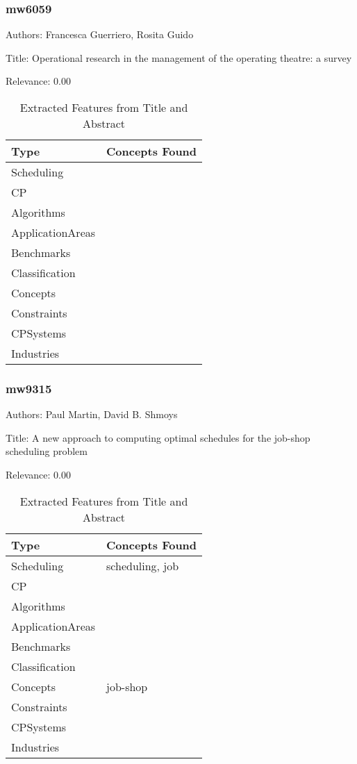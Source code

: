 \subsubsection{mw6059}
\label{mw:mw6059}

Authors: Francesca Guerriero, Rosita Guido

Title: Operational research in the management of the operating theatre: a survey

Relevance:  0.00

{\scriptsize
\begin{longtable}{p{2cm}p{20cm}}
\caption{Extracted Features from Title and Abstract}\\ \toprule
Type & Concepts Found\\ \midrule
\endhead
\bottomrule
\endfoot
Scheduling & \\ 
CP & \\ 
Algorithms & \\ 
ApplicationAreas & \\ 
Benchmarks & \\ 
Classification & \\ 
Concepts & \\ 
Constraints & \\ 
CPSystems & \\ 
Industries & \\ 
\end{longtable}
}



\subsubsection{mw9315}
\label{mw:mw9315}

Authors: Paul Martin, David B. Shmoys

Title: A new approach to computing optimal schedules for the job-shop scheduling problem

Relevance:  0.00

{\scriptsize
\begin{longtable}{p{2cm}p{20cm}}
\caption{Extracted Features from Title and Abstract}\\ \toprule
Type & Concepts Found\\ \midrule
\endhead
\bottomrule
\endfoot
Scheduling & scheduling, job\\ 
CP & \\ 
Algorithms & \\ 
ApplicationAreas & \\ 
Benchmarks & \\ 
Classification & \\ 
Concepts & job-shop\\ 
Constraints & \\ 
CPSystems & \\ 
Industries & \\ 
\end{longtable}
}



